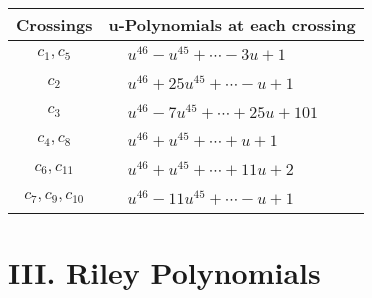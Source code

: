 \documentclass[1p]{elsarticle_modified}
\theoremstyle{definition}
\begin{document}
\begin{tabular}{m{50pt}|m{274pt}}
Crossings & \hspace{64pt}u-Polynomials at each crossing \\
\hline $$\begin{aligned}c_{1},c_{5}\end{aligned}$$&$\begin{aligned}
&u^{46}- u^{45}+\cdots-3 u+1
\end{aligned}$\\
\hline $$\begin{aligned}c_{2}\end{aligned}$$&$\begin{aligned}
&u^{46}+25 u^{45}+\cdots- u+1
\end{aligned}$\\
\hline $$\begin{aligned}c_{3}\end{aligned}$$&$\begin{aligned}
&u^{46}-7 u^{45}+\cdots+25 u+101
\end{aligned}$\\
\hline $$\begin{aligned}c_{4},c_{8}\end{aligned}$$&$\begin{aligned}
&u^{46}+u^{45}+\cdots+u+1
\end{aligned}$\\
\hline $$\begin{aligned}c_{6},c_{11}\end{aligned}$$&$\begin{aligned}
&u^{46}+u^{45}+\cdots+11 u+2
\end{aligned}$\\
\hline $$\begin{aligned}c_{7},c_{9},c_{10}\end{aligned}$$&$\begin{aligned}
&u^{46}-11 u^{45}+\cdots- u+1
\end{aligned}$\\
\hline
\end{tabular}\newpage\renewcommand{\arraystretch}{1}
\centering \section*{ III. Riley Polynomials}
\end{document}
